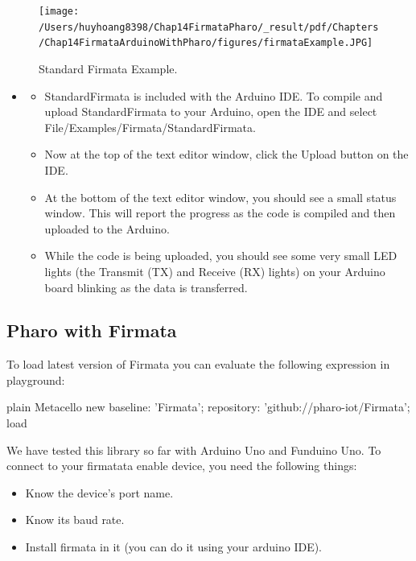 \documentclass[10pt,twoside,english]{_support/latex/sbabook/sbabook}
\begin{document}
\begin{figure}

\begin{center}
\texttt{[image: /Users/huyhoang8398/Chap14FirmataPharo/\_result/pdf/Chapters/Chap14FirmataArduinoWithPharo/figures/firmataExample.JPG]}\caption{Standard Firmata Example.\label{StandarFirmataExample}}\end{center}
\end{figure}


\begin{itemize}
\item 
\begin{itemize}
\item StandardFirmata is included with the Arduino IDE. To compile and upload StandardFirmata to your Arduino, open the IDE and select File/Examples/Firmata/StandardFirmata. 
\item Now at the top of the text editor window, click the Upload button on the IDE.
\item At the bottom of the text editor window, you should see a small status window. This will report the progress as the code is compiled and then uploaded to the Arduino. 
\item While the code is being uploaded, you should see some very small LED lights (the Transmit (TX) and Receive (RX) lights) on your Arduino board blinking as the data is transferred.
\end{itemize}

\end{itemize}
\subsection{Pharo with Firmata}
To load latest version of Firmata you can evaluate the following expression in playground:

\begin{displaycode}{plain}
  Metacello new
  baseline: 'Firmata';
  repository: 'github://pharo-iot/Firmata';
  load
\end{displaycode}

We have tested this library so far with Arduino Uno and Funduino Uno. 
To connect to your firmatata enable device, you need the following things:

\begin{itemize}
\item Know the device's port name.
\item Know its baud rate.
\item Install firmata in it (you can do it using your arduino IDE).
\end{itemize}
\end{document}
